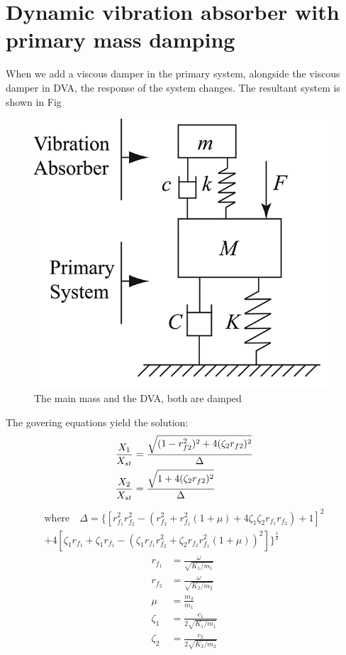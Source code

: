 \section{Dynamic vibration absorber with primary mass damping}
When we add a viscous damper in the primary system, alongside the viscous damper in DVA,  the response of the system changes. The resultant system is shown in Fig
\begin{figure}[h]
\centering
\includegraphics[scale=0.5]{"figures/withPrimaryMassDamping"}
\caption{The main mass and the DVA, both are damped}
\label{damped}
\end{figure}


The govering equations yield the solution: \\
\begin{align}
\dfrac{X_1}{X_{st}} &= \dfrac{\sqrt{(1-r_{f2}^2)^2 + 4(\zeta_2 r_{f2})^2}}{\Delta} \\
\dfrac{X_2}{X_{st}} &= \dfrac{\sqrt{\strut 1 + 4(\zeta_2 r_{f2})^2}}{\Delta}
\end{align}
\begin{multline}
\text{where}\quad \Delta = \lbrace\left[r_{f_1}^2 r_{f_2}^2 - ( r_{f_2}^2 + r_{f_1}^2 (1 + \mu)+ 4 \zeta_1\zeta_2 r_{f_1} r_{f_2} )  + 1\right] ^2 \\
+  4 \left[ \zeta_1 r_{f_1} + \zeta_1 r_{f_1} - ( \zeta_1 r_{f_1} r_{f_2}^2 + \zeta_2 r_{f_2} r_{f_1}^2  (1+\mu))^2\right] \rbrace ^\frac{1}{2}
\end{multline}
\begin{align}
r_{f_1} &= \frac{\omega}{\sqrt{K_1 / m_1}}\\
r_{f_2} &= \frac{\omega}{\sqrt{K_2 / m_2}}\\
\mu &= \frac{m_2}{m_1} \\
\zeta_1 &= \frac{c_1}{2\sqrt{K_1/m_1}} \\
\zeta_2 &= \frac{c_2}{2\sqrt{K_2/m_2}}
\end{align}

